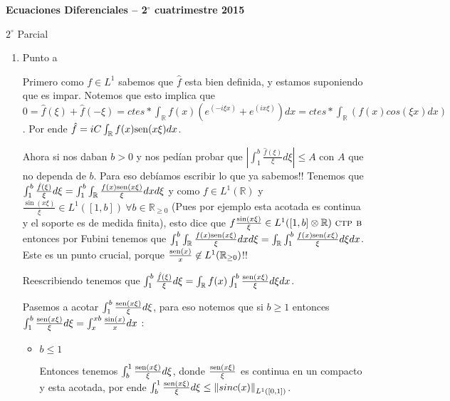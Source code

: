 \documentclass[11pt,a4paper,oneside]{article}
\newcommand{\R}{{\mathbb{R}}}
\newcommand\norm[1]{\left\lVert#1\right\rVert}
\def\sen{{\rm sen}}
\newenvironment{proof}[1][Demostraci\'on]{\begin{trivlist}
\item[\hskip \labelsep {\bfseries #1}]}{\end{trivlist}}
\begin{document}
\pagestyle{empty}
\pagestyle{fancy}
\fancyfoot[CO]{\slshape \thepage}
\renewcommand{\headrulewidth}{0pt}


\centerline{\bf Ecuaciones Diferenciales -- 2$^\circ$
cuatrimestre 2015}
\centerline{\sc $2^{\circ}$ Parcial}

\bigskip

\begin{proof}

\begin{enumerate}

\item {Punto a}

Primero como $f \in L^1$ sabemos que $\hat{f}$ esta bien definida, y estamos suponiendo que es impar. Notemos que esto implica que $0 = \hat{f}(\xi) + \hat{f}(-\xi) = ctes*\int_{\R}{f(x)(e^{(-i \xi x)} + e^{(ix \xi)})dx} = ctes * \int_{\R}(f(x)cos(\xi x)dx)$. Por ende $\hat{f} = iC \int_{\R}{f(x) \sen(x \xi)dx}$.

Ahora si nos daban $b > 0$ y nos ped\'ian probar que $ | \int_{1}^{b}{ \frac{\hat{f}(\xi)}{\xi} d\xi} | \leq A $ con $A$ que no dependa de $b$. Para eso deb\'iamos escribir lo que ya sabemos!! Tenemos que $\int_{1}^{b}{ \frac{\hat{f}(\xi)}{\xi} d\xi} = \int_{1}^{b}{\int_{\R}{\frac{f(x)\sen(x \xi)}{\xi} dx} d\xi}$ y como $ f \in L^1(\R) $ y $ \frac{\sin(x \xi)}{\xi} \in L^1([1,b]) \ \forall b \in \R_{\geq 0}$ (Pues por ejemplo esta acotada es continua y el soporte es de medida finita), esto dice que $ f \frac{\sin(x \xi)}{\xi} \in L^1([1,b] \otimes \R) \  \textsc{ctp b}$ entonces por Fubini tenemos que $ \int_{1}^{b}{\int_{\R}{\frac{f(x)\sen(x \xi)}{\xi} dx} d\xi} =  \int_{\R}{\int_{1}^{b}{\frac{f(x)\sen(x \xi)}{\xi} d\xi} dx}$. Este es un punto crucial, porque $\frac{\sen(x)}{x} \not \in L^1(\R_{\geq 0})$!!

Reescribiendo tenemos que $\int_{1}^{b}{ \frac{\hat{f}(\xi)}{\xi} d\xi} = \int_{\R}{f(x) \int_{1}^{b}{\frac{\sen(x \xi)}{\xi} d \xi} dx}$. 

Pasemos a acotar $\int_{1}^{b}{\frac{\sen(x \xi)}{\xi}d\xi}$, para eso notemos que si $b \geq 1$ entonces $\int_{1}^{b}{\frac{\sen(x \xi)}{\xi}d\xi} = \int_{x}^{xb}{\frac{\sin(x)}{x}dx}$ :

\begin{itemize}

\item {$b \leq 1$}

Entonces tenemos $\int_{b}^{1}{\frac{\sen(x \xi)}{\xi}d\xi}$, donde ${\frac{\sen(x \xi)}{\xi}}$ es continua en un compacto y esta acotada, por ende $\int_{b}^{1}{\frac{\sen(x \xi)}{\xi}d\xi} \leq  \norm{sinc(x)}_{L^1([0,1])}$.


\end{itemize}
\end{enumerate}
\end{proof}
\end{document}
